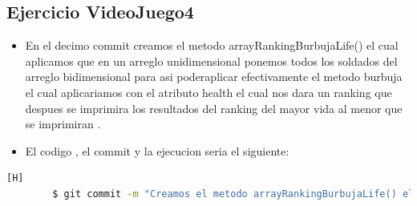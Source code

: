 \documentclass{article}
\begin{document}
	\subsection{Ejercicio VideoJuego4}
	\begin{itemize}	
		\item En el decimo commit creamos el metodo arrayRankingBurbujaLife() el cual aplicamos que en un arreglo unidimensional ponemos todos los soldados del arreglo bidimensional para asi poderaplicar efectivamente el metodo burbuja el cual aplicariamos con el atributo health el cual nos dara un ranking que despues se imprimira los resultados del ranking del mayor vida al menor que se imprimiran .
		\item El codigo , el commit y la ejecucion seria el siguiente:
	\end{itemize}	
	\begin{lstlisting}[language=bash,caption={Commit}][H]
		$ git commit -m "Creamos el metodo arrayRankingBurbujaLife() el cual aplicamos que en un arreglo unidimensional ponemos todos los soldados del arreglo bidimensional para asi poder aplicar efectivamente el metodo burbuja el cual aplicariamos con el atributo health el cual nos dara un ranking que despues se imprimira los resultados del ranking del mayor vida al menor que se imprimiran"
	\end{lstlisting}	
\end{document}
